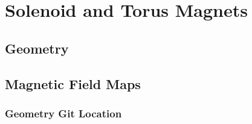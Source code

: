 \section{Solenoid and Torus Magnets}


\subsection{Geometry}


\subsection{Magnetic Field Maps}



\subsubsection{Geometry Git Location}

